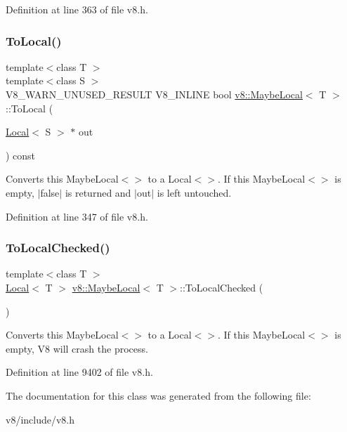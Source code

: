 Definition at line 363 of file v8.\+h.

\mbox{\label{classv8_1_1MaybeLocal_aa12fc83adccbf02f502a2aaeed9c32ab}} 
\subsubsection{\texorpdfstring{To\+Local()}{ToLocal()}}
{\footnotesize\ttfamily template$<$class T $>$ \\
template$<$class S $>$ \\
V8\+\_\+\+W\+A\+R\+N\+\_\+\+U\+N\+U\+S\+E\+D\+\_\+\+R\+E\+S\+U\+LT V8\+\_\+\+I\+N\+L\+I\+NE bool \mbox{\hyperlink{classv8_1_1MaybeLocal}{v8\+::\+Maybe\+Local}}$<$ T $>$\+::To\+Local (\begin{DoxyParamCaption}\item[{\mbox{\hyperlink{classv8_1_1Local}{Local}}$<$ S $>$ $\ast$}]{out }\end{DoxyParamCaption}) const\hspace{0.3cm}{\ttfamily [inline]}}

Converts this Maybe\+Local$<$$>$ to a Local$<$$>$. If this Maybe\+Local$<$$>$ is empty, $\vert$false$\vert$ is returned and $\vert$out$\vert$ is left untouched. 

Definition at line 347 of file v8.\+h.

\mbox{\label{classv8_1_1MaybeLocal_a9b2c9d50fca5897e3a03fd4c25d12415}} 
\subsubsection{\texorpdfstring{To\+Local\+Checked()}{ToLocalChecked()}}
{\footnotesize\ttfamily template$<$class T $>$ \\
\mbox{\hyperlink{classv8_1_1Local}{Local}}$<$ T $>$ \mbox{\hyperlink{classv8_1_1MaybeLocal}{v8\+::\+Maybe\+Local}}$<$ T $>$\+::To\+Local\+Checked (\begin{DoxyParamCaption}{ }\end{DoxyParamCaption})}

Converts this Maybe\+Local$<$$>$ to a Local$<$$>$. If this Maybe\+Local$<$$>$ is empty, V8 will crash the process. 

Definition at line 9402 of file v8.\+h.



The documentation for this class was generated from the following file\+:\begin{DoxyCompactItemize}
\item 
v8/include/v8.\+h\end{DoxyCompactItemize}
